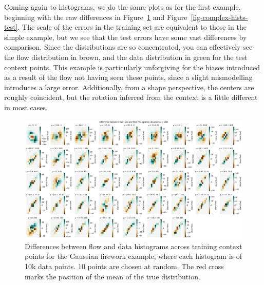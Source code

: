 \documentclass[
  11pt,
  numbers=noendperiod]{book}
\begin{document}
Coming again to histograms, we do the same plots as for the first
example, beginning with the raw differences in
Figure~\ref{fig-complex-hists-train} and
Figure~\ref{fig-complex-hists-test}. The scale of the errors in the
training set are equivalent to those in the simple example, but we see
that the test errors have some vast differences by comparison. Since the
distributions are so concentrated, you can effectively see the flow
distribution in brown, and the data distribution in green for the test
context points. This example is particularly unforgiving for the biases
introduced as a result of the flow not having seen these points, since a
slight mismodelling introduces a large error. Additionally, from a shape
perspective, the centers are roughly coincident, but the rotation
inferred from the context is a little different in most cases.

\begin{figure}

{\centering \includegraphics{./images/flows/complex/non-simplehistdifftrain-reallyunscaled.pdf}

}

\caption{\label{fig-complex-hists-train}Differences between flow and
data histograms across training context points for the Gaussian firework
example, where each histogram is of 10k data points. 10 points are chosen at random. The red cross marks
the position of the mean of the true distribution.}

\end{figure}
\end{document}
